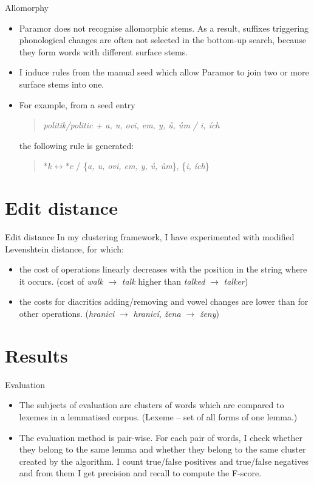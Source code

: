 \documentclass[hyperref={pdfencoding=unicode, unicode=true}]{beamer}
\begin{document}
\begin{frame}{Allomorphy}
\begin{itemize}
\item Paramor does not recognise allomorphic stems. As a result, suffixes triggering phonological changes are often not selected in the bottom-up search, because they form words with different surface stems. 
\item I induce rules from the manual seed which allow Paramor to join two or more surface stems into one.
\item For example, from a seed entry 
\begin{quote}
\emph{politik/politic + a, u, ovi, em, y, ů, ům / i, ích}
\end{quote}
the following rule is generated:
\begin{quote}
$*k \leftrightarrow *c$ / \{\emph{a, u, ovi, em, y, ů, ům}\}, \{\emph{i, ích}\}
\end{quote}
\end{itemize}

\end{frame}

\section{Edit distance}

\begin{frame}{Edit distance}
In my clustering framework, I have experimented with modified Levenshtein distance, for which:
\begin{itemize}
\item the cost of operations linearly decreases with the position in the string where it occurs. (cost of \emph{walk} $\rightarrow$ \emph{talk} higher than \emph{talked} $\rightarrow$ \emph{talker})
\item the costs for diacritics adding/removing and vowel changes are lower than for other operations. (\emph{hranici} $\rightarrow$ \emph{hranicí}, \emph{žena} $\rightarrow$ \emph{ženy})
\end{itemize}
\end{frame}

\section{Results}

\begin{frame}{Evaluation}
\begin{itemize}
\item The subjects of evaluation are clusters of words which are compared to lexemes in a lemmatised corpus. (Lexeme -- set of all forms of one lemma.)
\item The evaluation method is pair-wise. For each pair of words, I check whether they belong to the same lemma and whether they belong to the same cluster created by the algorithm. I count true/false positives and true/false negatives and from them I get precision and recall to compute the F-score.
\end{itemize}
\end{frame}
\end{document}

